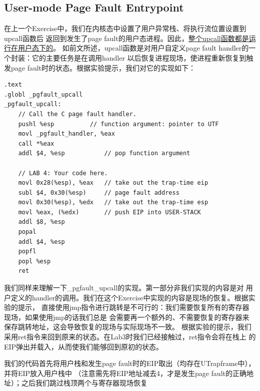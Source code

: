 \documentclass[12pt, letterpaper]{report}
\begin{document}
\subsection{User-mode Page Fault Entrypoint}
在上一个Exercise中，我们在内核态中设置了用户异常栈、将执行流位置设置到upcall函数后
返回到发生了page fault的用户态进程。因此，\underline{整个upcall函数都是运行在用户态下的}。
如前文所述，upcall函数是对用户自定义page fault handler的一个封装：它的主要任务是在调用handler
以后恢复进程现场，使进程重新恢复到触发page fault时的状态。根据实验提示，我们对它的实现如下：\par 
\lstset{style=AssemblyStyle}
\setmainfont{Consolas}
\begin{lstlisting}
.text
.globl _pgfault_upcall
_pgfault_upcall:
    // Call the C page fault handler.
    pushl %esp			// function argument: pointer to UTF
    movl _pgfault_handler, %eax
    call *%eax
    addl $4, %esp			// pop function argument

    // LAB 4: Your code here.
    movl 0x28(%esp), %eax	// take out the trap-time eip
    subl $4, 0x30(%esp)     // page fault address
    movl 0x30(%esp), %edx	// take out the trap-time esp
    movl %eax, (%edx)       // push EIP into USER-STACK
    addl $8, %esp
    popal
    addl $4, %esp
    popfl
    popl %esp
    ret
\end{lstlisting}
\setmainfont{Times New Roman}
\par 
我们同样来理解一下\_pgfault\_upcall的实现。第一部分非我们实现的内容是对
用户定义的handler的调用。我们在这个Exercise中实现的内容是现场的恢复。根据实验的提示，
直接使用jmp指令进行跳转是不可行的：我们需要恢复所有的寄存器现场，如果使用jmp的话我们总是
会需要再一个额外的、不需要恢复的寄存器来保存跳转地址，这会导致恢复的现场与实际现场不一致。
根据实验的提示，我们采用ret指令来回到原来的状态。在Lab3时我们已经接触过，ret指令会将在栈上
的EIP弹出并载入，从而使我们能够回到原初的状态。\par 
我们的代码首先将用户栈和发生page fault时的EIP取出（均存在UTrapframe中），并将EIP放入用户栈中
（注意需先将EIP地址减去4，才是发生page fault的正确地址）；之后我们跳过栈顶两个与寄存器现场恢复
\end{document}
